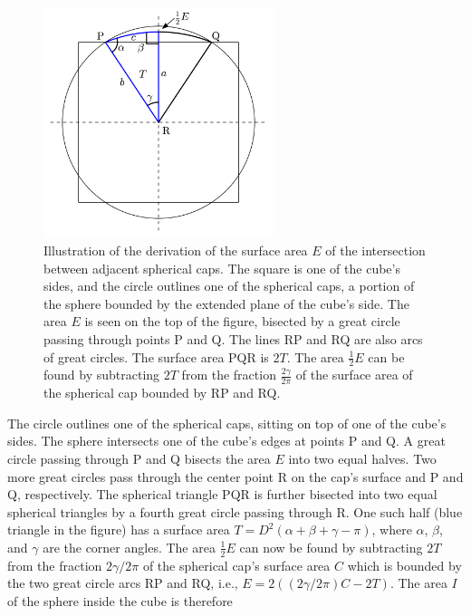 \begin{figure}[h]
  \centering
  \includegraphics[width=0.6\textwidth]{3D_mask_case3.pdf}
  \caption[Illustration of the derivation of the surface area $E$ of the intersection between adjacent spherical caps]{Illustration of the derivation of the surface area $E$ of the intersection between adjacent spherical caps. The square is one of the cube's sides, and the circle outlines one of the spherical caps, a portion of the sphere bounded by the extended plane of the cube's side. The area $E$ is seen on the top of the figure, bisected by a great circle passing through points P and Q. The lines RP and RQ are also arcs of great circles. The surface area PQR is $2T$. The area $\frac{1}{2}E$ can be found by subtracting $2T$ from the fraction $\frac{2\gamma}{2\pi}$ of the surface area of the spherical cap bounded by RP and RQ.}
  \label{fig:3D_mask_case3}
\end{figure}
The circle outlines one of the spherical caps, sitting on top of one of the cube's sides. The sphere intersects one of the cube's edges at points P and Q. A great circle passing through P and Q bisects the area $E$ into two equal halves. Two more great circles pass through the center point R on the cap's surface and P and Q, respectively. The spherical triangle PQR is further bisected into two equal spherical triangles by a fourth great circle passing through R. One such half (blue triangle in the figure) has a surface area $T = D^2\left( \alpha+\beta+\gamma-\pi \right)$, where $\alpha$, $\beta$, and $\gamma$ are the corner angles. The area $\frac{1}{2}E$ can now be found by subtracting $2T$ from the fraction $2\gamma/2\pi$ of the spherical cap's surface area $C$ which is bounded by the two great circle arcs RP and RQ, i.e., $E = 2\left( (2\gamma/2\pi)C - 2T \right)$. The area $I$ of the sphere inside the cube is therefore
